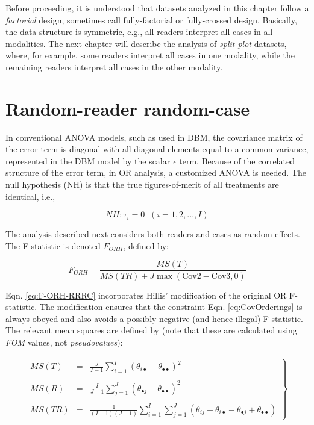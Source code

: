 \documentclass[
]{book}
\begin{document}
Before proceeding, it is understood that datasets analyzed in this chapter follow a \emph{factorial} design, sometimes call fully-factorial or fully-crossed design. Basically, the data structure is symmetric, e.g., all readers interpret all cases in all modalities. The next chapter will describe the analysis of \emph{split-plot} datasets, where, for example, some readers interpret all cases in one modality, while the remaining readers interpret all cases in the other modality.

\hypertarget{or-analysis-st-rrrc}{%
\section{Random-reader random-case}\label{or-analysis-st-rrrc}}

In conventional ANOVA models, such as used in DBM, the covariance matrix of the error term is diagonal with all diagonal elements equal to a common variance, represented in the DBM model by the scalar \(\epsilon\) term. Because of the correlated structure of the error term, in OR analysis, a customized ANOVA is needed. The null hypothesis (NH) is that the true figures-of-merit of all treatments are identical, i.e.,

\begin{equation}
NH:\tau_i=0\;\; (i=1,2,...,I)
\label{eq:ORModelNH}
\end{equation}

The analysis described next considers both readers and cases as random effects. The F-statistic is denoted \(F_{ORH}\), defined by:

\begin{equation}
F_{ORH}=\frac{MS(T)}{MS(TR)+J\max(\text{Cov2}-\text{Cov3},0)}
\label{eq:F-ORH-RRRC}
\end{equation}

Eqn. \eqref{eq:F-ORH-RRRC} incorporates Hillis' modification of the original OR F-statistic. The modification ensures that the constraint Eqn. \eqref{eq:CovOrderings} is always obeyed and also avoids a possibly negative (and hence illegal) F-statistic. The relevant mean squares are defined by (note that these are calculated using \emph{FOM} values, not \emph{pseudovalues}):

\begin{align}
\left.\begin{array}{rcl}
MS(T)&=&\frac{J}{I-1}\sum_{i=1}^{I}(\theta_{i\bullet}-\theta_{\bullet\bullet})^2\\
\\ 
MS(R)&=&\frac{I}{J-1}\sum_{j=1}^{J}(\theta_{\bullet j}-\theta_{\bullet\bullet})^2\\
\\
MS(TR)&=&\frac{1}{(I-1)(J-1)}\sum_{i=1}^{I}\sum_{j=1}^{J}(\theta_{ij}-\theta_{i\bullet}-\theta_{\bullet j}+\theta_{\bullet\bullet})
\end{array}\right\}
\label{eq:MS-OR}
\end{align}
\end{document}
